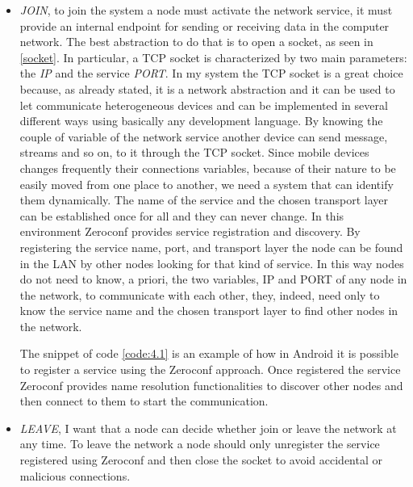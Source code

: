 \begin{itemize}
	\item \textit{JOIN}, to join the system a node must activate the network service, it must provide an internal endpoint for sending or receiving data in the computer network. The best abstraction to do that is to open a socket, as seen in \ref{socket}. In particular, a TCP socket is characterized by two main parameters: the \textit{IP} and the service \textit{PORT}. In my system the TCP socket is a great choice because, as already stated, it is a network abstraction and it can be used to let communicate heterogeneous devices and can be implemented in several different ways using basically any development language. By knowing the couple of variable of the network service another device can send message, streams and so on, to it through the TCP socket.  Since mobile devices changes frequently their connections variables, because of their nature to be easily moved from one place to another, we need a system that can identify them dynamically. The name of the service and the chosen transport layer can be established once for all and they can never change. In this environment Zeroconf provides service registration and discovery. By registering the service name, port, and transport layer the node can be found in the LAN by other nodes looking for that kind of service. In this way nodes do not need to know, a priori, the two variables, IP and PORT of any node in the network, to communicate with each other, they, indeed, need only to know the service name and the chosen transport layer to find other nodes in the network.
	
	The snippet of code \ref{code:4.1} is an example of how in Android it is possible to register a service using the Zeroconf approach. Once registered the service Zeroconf provides name resolution functionalities to discover other nodes and then connect to them to start the communication.
	\item \textit{LEAVE}, I want that a node can decide whether join or leave the network at any time. To leave the network a node should only unregister the service registered using Zeroconf and then close the socket to avoid accidental or malicious connections.

\end{itemize}
